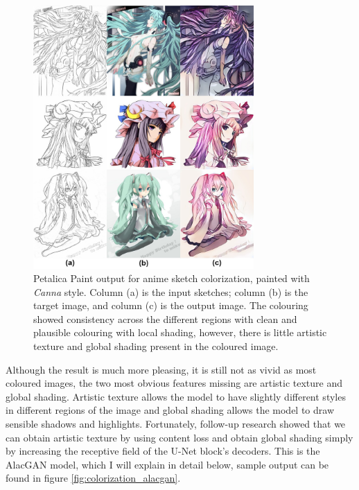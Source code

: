 \begin{figure}
    \centering
    \includegraphics[width=0.75\textwidth]{images/colorization/petalica.jpg}
    \caption[Petalica Paint output for anime sketch colorization, painted with \textit{Canna\protect\footnotemark}  style.]{Petalica Paint output for anime sketch colorization, painted with \textit{Canna\protect\footnotemark}  style. Column (a) is the input sketches; column (b) is the target image, and column (c) is the output image.\cite{steinsDeepLearningProject2022} The colouring showed consistency across the different regions with clean and plausible colouring with local shading, however, there is little artistic texture and global shading present in the coloured image.} 
    \label{fig:colorization_petalica}
\end{figure}


Although the result is much more pleasing, it is still not as vivid as most coloured images, the two most obvious features missing are artistic texture and global shading. Artistic texture allows the model to have slightly different styles in different regions of the image and global shading allows the model to draw sensible shadows and highlights. Fortunately, follow-up research showed that we can obtain artistic texture by using content loss and obtain global shading simply by increasing the receptive field of the U-Net block's decoders\cite{ciUserGuidedDeepAnime2018}. This is the AlacGAN model, which I will explain in detail below, sample output can be found in figure \ref{fig:colorization_alacgan}.

